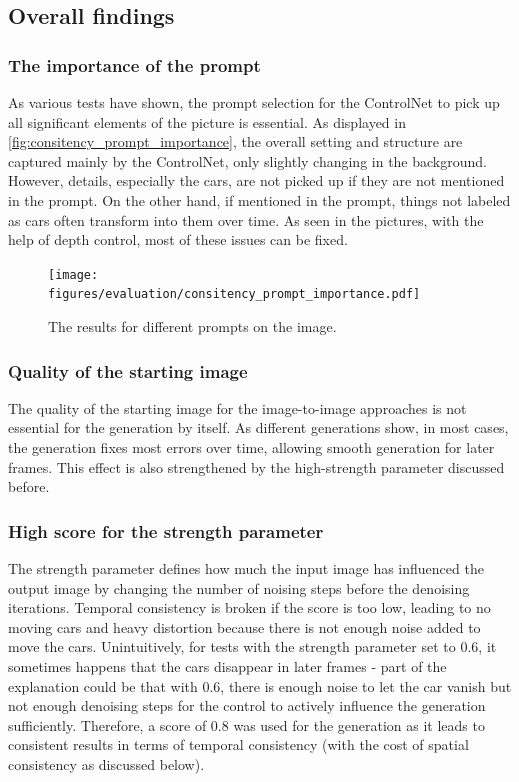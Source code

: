 \subsection{Overall findings}

\subsubsection{The importance of the prompt}

As various tests have shown, the prompt selection for the ControlNet to pick up all significant elements of the picture is essential. As displayed in \autoref{fig:consitency_prompt_importance}, the overall setting and structure are captured mainly by the ControlNet, only slightly changing in the background. However, details, especially the cars, are not picked up if they are not mentioned in the prompt. On the other hand, if mentioned in the prompt, things not labeled as cars often transform into them over time. As seen in the pictures, with the help of depth control, most of these issues can be fixed. 

\begin{figure}[H]
  \centering
  \texttt{[image: figures/evaluation/consitency\_prompt\_importance.pdf]}
  \caption{The results for different prompts on the image.}
  \label{fig:consitency_prompt_importance}
  \clearpage
\end{figure}

\subsubsection{Quality of the starting image}

The quality of the starting image for the image-to-image approaches is not essential for the generation by itself. As different generations show, in most cases, the generation fixes most errors over time, allowing smooth generation for later frames. This effect is also strengthened by the high-strength parameter discussed before.

\subsubsection{High score for the strength parameter}
\label{sec:high_score_for_the_strength_parameter}
The strength parameter defines how much the input image has influenced the output image by changing the number of noising steps before the denoising iterations. Temporal consistency is broken if the score is too low, leading to no moving cars and heavy distortion because there is not enough noise added to move the cars. Unintuitively, for tests with the strength parameter set to 0.6, it sometimes happens that the cars disappear in later frames - part of the explanation could be that with 0.6, there is enough noise to let the car vanish but not enough denoising steps for the control to actively influence the generation sufficiently. Therefore, a score of 0.8 was used for the generation as it leads to consistent results in terms of temporal consistency (with the cost of spatial consistency as discussed below). 

